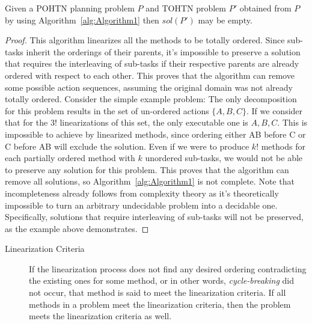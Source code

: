 \begin{theorem}\label{thm:notCompleteness}
	Given a POHTN planning problem $P$ and TOHTN problem
	$P'$ obtained from $P$ by using Algorithm~\ref{alg:Algorithm1}
	then $sol(P')$ may be empty.
\end{theorem}
\begin{proof}
	This algorithm linearizes all the methods to be totally ordered. Since sub-tasks inherit the orderings of their parents, it's impossible to preserve a solution that requires the interleaving of sub-tasks if their respective parents are already ordered with respect to each other. This proves that the algorithm can remove some possible action sequences, assuming the original domain was not already totally ordered. Consider the simple example problem:
	The only decomposition for this problem results in the set of un-ordered actions $\{A, B, C\}$.
	If we consider that for the $3!$ linearizations of this set, the only executable one is $A, B, C$. This is impossible to achieve by linearized methods, since ordering either AB before C or C before AB will exclude the solution.
	Even if we were to produce $k!$ methods for each partially ordered method with $k$ unordered sub-tasks, we would not be able to preserve any solution for this problem.
	This proves that the algorithm can remove all solutions, so Algorithm~\ref{alg:Algorithm1} is not complete. Note that incompleteness already follows from complexity theory as it's theoretically impossible to turn an arbitrary undecidable problem into a decidable one.
	Specifically, solutions that require interleaving of sub-tasks will not be preserved, as the example above demonstrates.
\end{proof}



\begin{description}
	\item[Linearization Criteria] If the linearization process does not find any desired ordering contradicting the existing ones for some method, or in other words, \emph{cycle-breaking} did not occur, that method is said to meet the linearization criteria. If all methods in a problem meet the linearization criteria, then the problem meets the linearization criteria as well.
\end{description}



